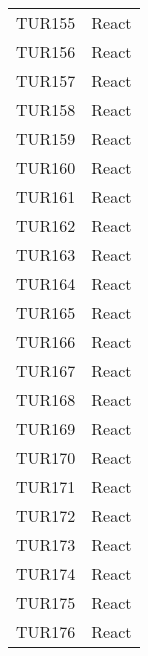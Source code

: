\documentclass[PianoDiQualifica.tex]{subfiles}
\begin{document}
\begin{longtable}[H]{P{5cm}P{9cm}}
	TUR155 & React \\ 
	TUR156 & React \\ 
	TUR157 & React \\ 
	TUR158 & React \\ 
	TUR159 & React \\ 
	TUR160 & React \\ 
	TUR161 & React \\ 
	TUR162 & React \\ 
	TUR163 & React \\ 
	TUR164 & React \\ 
	TUR165 & React \\ 
	TUR166 & React \\ 
	TUR167 & React \\ 
	TUR168 & React \\ 
	TUR169 & React \\ 
	TUR170 & React \\ 
	TUR171 & React \\ 
	TUR172 & React \\ 
	TUR173 & React \\ 
	TUR174 & React \\ 
	TUR175 & React \\ 
	TUR176 & React \\
	

\end{longtable}
\end{document}
